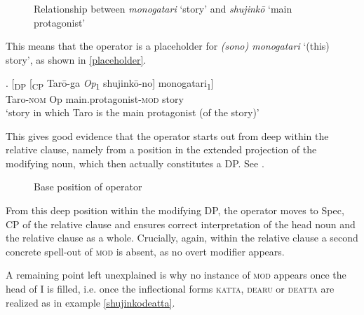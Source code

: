  \begin{figure}
\centering
{}
\caption{Relationship between \textit{monogatari} `story’ and \textit{shujinkō} `main protagonist’}
\label{monogatari no shujinko tree}
\end{figure}

This means that the operator is a placeholder for \textit{(sono) monogatari} `(this) story’, as shown in \ref{placeholder}.

\exg. [\textsubscript{DP} [\textsubscript{CP} Tarō-ga \textit{Op}\textsubscript{1} shujinkō-no] monogatari\textsubscript{1}]\\
{} {} Taro-\textsc{nom} Op main.protagonist-\textsc{mod} story\\
`story in which Taro is the main protagonist (of the story)’ \label{placeholder}

This gives good evidence that the operator starts out from deep within the relative clause, namely from a position in the extended projection of the modifying noun, which then actually constitutes a DP. See . 

\begin{figure}
\centering
{}
\caption{Base position of operator}
\label{Base position operator}
\end{figure}

From this deep position within the modifying DP, the operator moves to Spec, CP of the relative clause and ensures correct interpretation of the head noun and the relative clause as a whole. Crucially, again, within the relative clause a second concrete spell-out of \textsc{mod} is absent, as no overt modifier appears.

A remaining point left unexplained is why no instance of \textsc{mod} appears once the head of I is filled, i.e. once the inflectional forms \textsc{katta}, \textsc{dearu} or \textsc{deatta} are realized as in example \ref{shujinkodeatta}.

